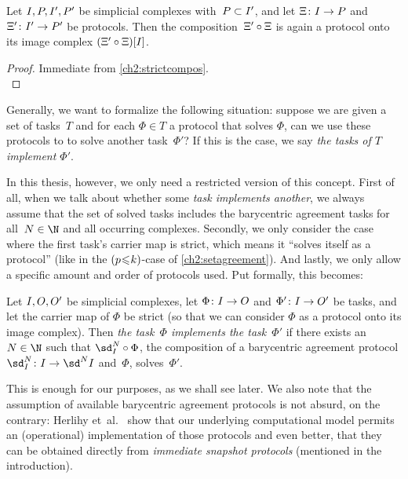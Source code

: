\begin{thCorollary}
    Let $\cI,\cP,\cI',\cP'$ be simplicial complexes with~$\cP\subset\cI'$,
    and let $\Xi\colon\cI\to\cP$ and $\Xi'\colon\cI'\to\cP'$ be protocols.
    Then the composition~$\Xi'\after\Xi$ is again
    a protocol onto its image complex $(\Xi'\after\Xi)[\cI]$.
\end{thCorollary}

\begin{proof}
    Immediate from \cref{ch2:strictcompos}.
    \\
\end{proof}

Generally, we want to formalize the following situation: suppose we are
given a set of tasks~$T$ and for each $\Phi\in T$ a protocol that
solves $\Phi$, can we use these protocols to to solve another task~$\Phi'$? If
this is the case, we say \emph{the tasks of $T$ implement $\Phi'$}.

In this thesis, however, we only need a restricted version of this concept.
First of all, when we talk about whether some \emph{task implements another},
we always assume that the set of solved tasks includes the barycentric agreement
tasks  for all~$N\in\N$ and all occurring
complexes. Secondly, we only consider the case where the first task's carrier map
is strict, which means it \enquote{solves itself as a protocol} (like in the
$(p\mkern1mu{\leq}\mkern1muk)$-case of \cref{ch2:setagreement}). And lastly, we
only allow a specific amount and order of protocols used. Put formally, this
becomes:

\begin{thDef}
    Let $\cI,\cO,\cO'$ be simplicial complexes, let
    $\Phi\colon\cI\to\cO$ and $\Phi'\colon\cI\to\cO'$ be tasks, and
    let the carrier map of $\Phi$ be strict (so that we can consider $\Phi$ as a
    protocol onto its image complex). Then \emph{the task~$\Phi$ implements the
    task~$\Phi'$} if there exists an $N\in\N$ such that $\sd_{\cI}^N\after\Phi$,
    the composition of a barycentric agreement protocol
    $\sd_{\cI}^N\colon\cI\to\sd^N\cI$ and~$\Phi$, solves~$\Phi'$.
\end{thDef}

This is enough for our purposes, as we shall see later. We also note that the
assumption of available barycentric agreement protocols is not absurd, on
the contrary: Herlihy et~al.~\cite[Corollary 4.2.10]{bookc:herlihyetal13} show
that our underlying computational model permits an (operational) implementation
of those protocols and even better, that they can be obtained directly from 
\emph{immediate snapshot protocols} (mentioned in the introduction).

